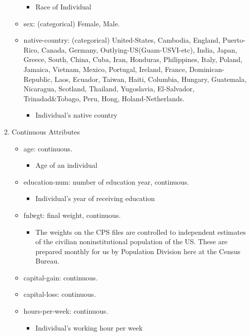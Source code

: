 \documentclass[11pt]{article}
\providecommand{\tightlist}{%
      \setlength{\itemsep}{0pt}\setlength{\parskip}{0pt}}
\begin{document}
\begin{enumerate}
\begin{itemize}
    \begin{itemize}
    \tightlist
    \item
      Race of Individual
    \end{itemize}
  \item
    sex: (categorical) Female, Male.
  \item
    native-country: (categorical) United-States, Cambodia, England,
    Puerto-Rico, Canada, Germany, Outlying-US(Guam-USVI-etc), India,
    Japan, Greece, South, China, Cuba, Iran, Honduras, Philippines,
    Italy, Poland, Jamaica, Vietnam, Mexico, Portugal, Ireland, France,
    Dominican-Republic, Laos, Ecuador, Taiwan, Haiti, Columbia, Hungary,
    Guatemala, Nicaragua, Scotland, Thailand, Yugoslavia, El-Salvador,
    Trinadad\&Tobago, Peru, Hong, Holand-Netherlands.

    \begin{itemize}
    \tightlist
    \item
      Individual's native country
    \end{itemize}
  \end{itemize}
\item
  Continuous Attributes

  \begin{itemize}
  \tightlist
  \item
    age: continuous.

    \begin{itemize}
    \tightlist
    \item
      Age of an individual
    \end{itemize}
  \item
    education-num: number of education year, continuous.

    \begin{itemize}
    \tightlist
    \item
      Individual's year of receiving education
    \end{itemize}
  \item
    fnlwgt: final weight, continuous.

    \begin{itemize}
    \tightlist
    \item
      The weights on the CPS files are controlled to independent
      estimates of the civilian noninstitutional population of the US.
      These are prepared monthly for us by Population Division here at
      the Census Bureau.
    \end{itemize}
  \item
    capital-gain: continuous.
  \item
    capital-loss: continuous.
  \item
    hours-per-week: continuous.

    \begin{itemize}
    \tightlist
    \item
      Individual's working hour per week
    \end{itemize}
  \end{itemize}
\end{enumerate}
\end{document}
